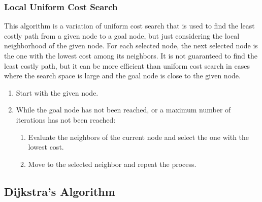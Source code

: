 \subsubsection{Local Uniform Cost Search}

This algorithm is a variation of uniform cost search that is used to find the least costly path from a given node to a goal node, but just considering the local neighborhood of the given node. For each selected node, the next selected node is the one with the lowest cost among its neighbors. It is not guaranteed to find the least costly path, but it can be more efficient than uniform cost search in cases where the search space is large and the goal node is close to the given node.
\begin{enumerate}
    \item Start with the given node.
    \item While the goal node has not been reached, or a maximum number of iterations has not been reached:
    \begin{enumerate}
        \item Evaluate the neighbors of the current node and select the one with the lowest cost.
        \item Move to the selected neighbor and repeat the process.
    \end{enumerate} 
\end{enumerate}

\subsection{Dijkstra's Algorithm}

